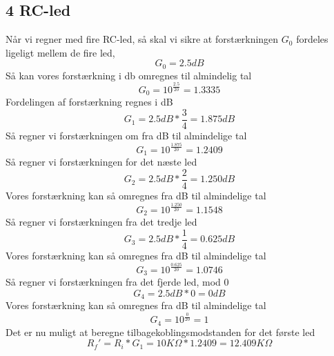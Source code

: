 \subsection{4 RC-led}
%
Når vi regner med fire RC-led, så skal vi sikre at forstærkningen $G_{0}$ fordeles ligeligt mellem de fire led, 
%
\begin{equation}
	G_0 = 2.5dB
\end{equation}
\noindent
%
Så kan vores forstærkning i db omregnes til almindelig tal
%
\begin{equation}
	G_0 = 10^{\frac{2.5}{20}} = 1.3335
\end{equation}
\noindent
%
Fordelingen af forstærkning regnes i dB
%
\begin{equation}
	G_1 = 2.5dB*\frac{3}{4} = 1.875dB
\end{equation}
\noindent
%
Så regner vi forstærkningen om fra dB til almindelige tal
%
\begin{equation}
	G_1 = 10^{\frac{1.875}{20}} = 1.2409
\end{equation}
\noindent
%
Så regner vi forstærkningen for det næste led
%
\begin{equation}
	G_2 = 2.5dB*\frac{2}{4} = 1.250dB
\end{equation}
\noindent
%
Vores forstærkning kan så omregnes fra dB til almindelige tal
%
\begin{equation}
	G_2 = 10^{\frac{1.250}{20}} = 1.1548
\end{equation}
\noindent
%
Så regner vi forstærkningen fra det tredje led 
%
\begin{equation}
	G_3 = 2.5dB*\frac{1}{4} = 0.625dB
\end{equation}
\noindent
%
Vores forstærkning kan så omregnes fra dB til almindelige tal
%
\begin{equation}
	G_3 = 10^{\frac{0.625}{20}} = 1.0746
\end{equation}
\noindent
%
Så regner vi forstærkningen fra det fjerde led, mod 0 
%
\begin{equation}
	G_4 = 2.5dB*0 = 0dB
\end{equation}
\noindent
%
Vores forstærkning kan så omregnes fra dB til almindelige tal
%
\begin{equation}
	G_4 = 10^{\frac{0}{20}} = 1
\end{equation}
\noindent
%
Det er nu muligt at beregne tilbagekoblingsmodstanden for det første led
%
\begin{equation}
	R_f' = R_i*G_1 = 10K\Omega*1.2409 = 12.409K\Omega
\end{equation}
